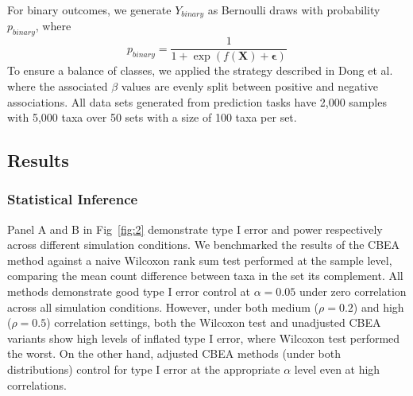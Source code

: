 \documentclass{article}
\begin{document}
For binary outcomes, we generate $Y_{binary}$ as Bernoulli draws with probability $p_{binary}$, where 
\begin{equation}
    p_{binary} = \frac{1}{1 + \exp(f(\mathbf{X}) + \mathbf{\epsilon})}
\end{equation}
To ensure a balance of classes, we applied the strategy described in Dong et al. \cite{dong2020} where the associated $\beta$ values are evenly split between positive and negative associations. All data sets generated from prediction tasks have 2,000 samples with 5,000 taxa over 50 sets with a size of 100 taxa per set.

\subsection{Results} 
\subsubsection{Statistical Inference}
Panel A and B in Fig~\ref{fig:2} demonstrate type I error and power respectively across different simulation conditions. We benchmarked the results of the CBEA method against a naive Wilcoxon rank sum test performed at the sample level, comparing the mean count difference between taxa in the set its complement. All methods demonstrate good type I error control at $\alpha = 0.05$ under zero correlation across all simulation conditions. However, under both medium ($\rho = 0.2$) and high ($\rho = 0.5$) correlation settings, both the Wilcoxon test and unadjusted CBEA variants show high levels of inflated type I error, where Wilcoxon test performed the worst. On the other hand, adjusted CBEA methods (under both distributions) control for type I error at the appropriate $\alpha$ level even at high correlations. 
\end{document}
